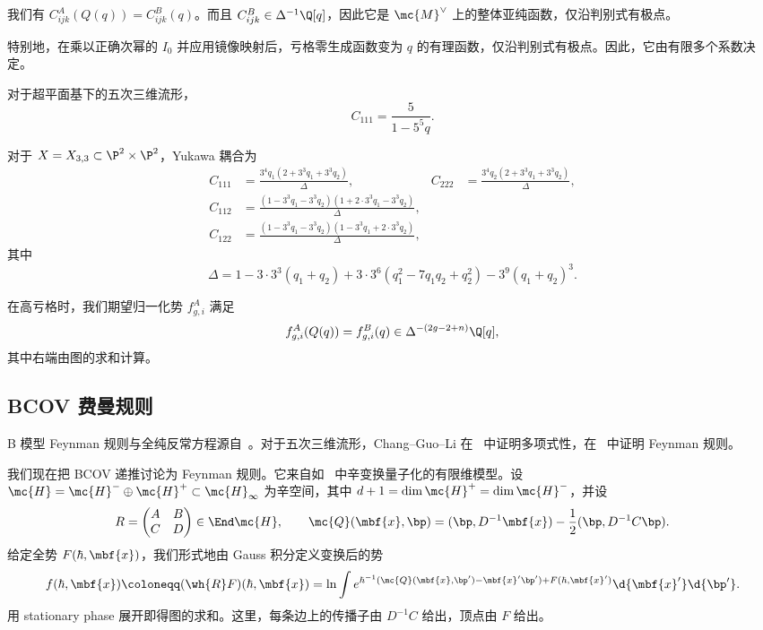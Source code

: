 \begin{thm}
    我们有 \(C^A_{ijk}(Q(q)) = C^B_{ijk}(q)\)。而且 \(C^B_{ijk} \in \Delta^{-1}\Q[q]\)，因此它是 \(\mc{M}^{\vee}\) 上的整体亚纯函数，仅沿判别式有极点。
\end{thm}

特别地，在乘以正确次幂的 \(I_0\) 并应用镜像映射后，亏格零生成函数变为 \(q\) 的有理函数，仅沿判别式有极点。因此，它由有限多个系数决定。

\begin{exm}
    对于超平面基下的五次三维流形，
    \[ C_{111} = \frac{5}{1-5^5 q}. \]
\end{exm}

\begin{exm}
    对于 \(X = X_{3,3} \subset \P^2 \times \P^2\)，Yukawa 耦合为
    \begin{align*}
        C_{111} &= \frac{3^4 q_1 (2+3^3q_1+3^3q_2)}{\Delta}, & C_{222} &= \frac{3^4 q_2(2+3^3q_1+3^3q_2)}{\Delta}, \\
        C_{112} &= \frac{(1-3^3q_1-3^3q_2)(1+2\cdot 3^3 q_1 - 3^3 q_2)}{\Delta}, \\
        C_{122} &= \frac{(1-3^3q_1-3^3q_2)(1-3^3q_1+2\cdot3^3q_2)}{\Delta},
    \end{align*}
    其中
    \[ \Delta = 1 - 3\cdot3^3(q_1+q_2) + 3\cdot3^6(q_1^2 - 7q_1q_2+q_2^2) - 3^9(q_1+q_2)^3. \]
\end{exm}

在高亏格时，我们期望归一化势 \(f^A_{g,i}\) 满足
\[ f^A_{g,i}(Q(q)) = f^B_{g,i}(q) \in \Delta^{-(2g-2+n)}\Q[q], \]
其中右端由图的求和计算。

\subsection{BCOV 费曼规则}%
\label{sub:The BCOV Feynman rule}

B 模型 Feynman 规则与全纯反常方程源自~\cite{BCOV1994}。对于五次三维流形，Chang--Guo--Li 在~\cite{CGL2021} 中证明多项式性，在~\cite{CGL2026} 中证明 Feynman 规则。

我们现在把 BCOV 递推讨论为 Feynman 规则。它来自如~ 中辛变换量子化的有限维模型。设 \(\mc{H} = \mc{H}^- \oplus \mc{H}^+ \subset \mc{H}_{\infty}\) 为辛空间，其中 \(d+1 = \dim \mc{H}^+ = \dim \mc{H}^-\)，并设
\[ R = \begin{pmatrix} A & B \\ C & D \end{pmatrix} \in \End \mc{H}, \qquad \mc{Q}(\mbf{x},\bp) = (\bp, D^{-1}\mbf{x}) - \frac{1}{2}(\bp, D^{-1}C\bp). \]
给定全势 \(F(\hbar, \mbf{x})\)，我们形式地由 Gauss 积分定义变换后的势
\[ f(\hbar, \mbf{x}) \coloneqq (\wh{R}F)(\hbar,\mbf{x}) = \ln \int e^{\hbar^{-1}(\mc{Q}(\mbf{x},\bp') - \mbf{x}'\bp') + F(\hbar,\mbf{x}')}\d{\mbf{x}'}\d{\bp'}. \]
用 stationary phase 展开即得图的求和。这里，每条边上的传播子由 \(D^{-1}C\) 给出，顶点由 \(F\) 给出。


